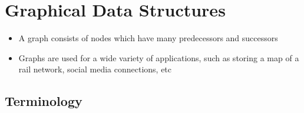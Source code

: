 
\section*{Graphical Data Structures}

\begin{itemize}
  \item A graph consists of nodes which have many predecessors and successors
  \item Graphs are used for a wide variety of applications, such as storing a map of a rail network, social media connections, etc
\end{itemize}

\subsection*{Terminology}

